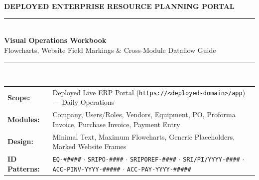 \documentclass[11pt,a4paper,openany]{book}
\begin{document}
\begin{titlepage}
    \centering
    \vspace*{0.8cm}
    {\Large \color{tealaccent}\textbf{DEPLOYED ENTERPRISE RESOURCE PLANNING PORTAL}}\\[0.3cm]
    \rule{\textwidth}{1.5pt}\\[0.5cm]
    {\Huge \color{navyblue}\textbf{Visual Operations Workbook}}\\[0.25cm]
    {\Large \color{darkgray}Flowcharts, Website Field Markings \& Cross-Module Dataflow Guide}\\[0.4cm]
    \rule{\textwidth}{1.5pt}\\[0.9cm]

    \begin{tcolorbox}[colback=softblue, colframe=navyblue, width=0.95\textwidth, arc=4pt]
        \begin{tabularx}{\textwidth}{l X}
            \textbf{Scope:} & Deployed Live ERP Portal (\texttt{https://<deployed-domain>/app}) --- Daily Operations \\
            \textbf{Modules:} & Company, Users/Roles, Vendors, Equipment, PO, Proforma Invoice, Purchase Invoice, Payment Entry \\
            \textbf{Design:} & Minimal Text, Maximum Flowcharts, Generic Placeholders, Marked Website Frames \\
            \textbf{ID Patterns:} & \texttt{EQ-\#\#\#\#\#} $\cdot$ \texttt{SRIPO-\#\#\#\#} $\cdot$ \texttt{SRIPOREF-\#\#\#\#} $\cdot$ \texttt{SRI/PI/YYYY-\#\#\#\#} $\cdot$ \texttt{ACC-PINV-YYYY-\#\#\#\#\#} $\cdot$ \texttt{ACC-PAY-YYYY-\#\#\#\#\#}
        \end{tabularx}
    \end{tcolorbox}

    \vspace{0.8cm}


\end{titlepage}
\end{document}
